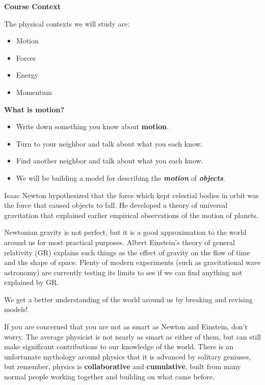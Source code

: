 \documentclass[]{article}
\begin{document}
\begin{PresentSpace}
\begin{center}
	\textbf{Course Context}
\end{center}
The physical contexts we will study are:
\begin{itemize}
	\item Motion
	\item Forces
	\item Energy
	\item Momentum
\end{itemize}
\vspace{3cm}
\begin{center}
	\textbf{What is motion?}
\end{center}
\begin{itemize}
	\item Write down something you know about \textbf{motion}.
	\item Turn to your neighbor and talk about what you each know.
	\item Find another neighbor and talk about what you each know.
	\item We will be building a model for describing the \textit{\textbf{motion}} of \textit{\textbf{objects}}.
\end{itemize}
\end{PresentSpace}
\newpage
\begin{TeacherMargin}
Isaac Newton hypothesized that the force which kept celestial bodies in orbit was the force that caused objects to fall. He developed a theory of universal gravitation that explained earlier empirical observations of the motion of planets.

Newtonian gravity is not perfect, but it is a good approximation to the world around us for most practical purposes. Albert Einstein's theory of general relativity (GR) explains such things as the effect of gravity on the flow of time and the shape of space. Plenty of modern experiments (such as gravitational wave astronomy) are currently testing its limits to see if we can find anything not explained by GR.

We get a better understanding of the world around us by breaking and revising models!

If you are concerned that you are not as smart as Newton and Einstein, don't worry. The average physicist is not nearly as smart as either of them, but can still make significant contributions to our knowledge of the world. There is an unfortunate mythology around physics that it is advanced by solitary geniuses, but remember, physics is \textbf{collaborative} and \textbf{cumulative}, built from many normal people working together and building on what came before.
\end{TeacherMargin}
\end{document}
